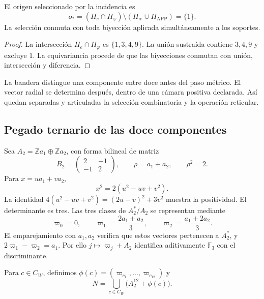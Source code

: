 \begin{lemma}
\label{lem:lf-origin}
El origen seleccionado por la incidencia es
\[
 o_*=(H_e\cap H_\varphi)
                 \setminus(H_\alpha^-\cup H_{\mathrm{APP}})
     =\{1\}.
\]
La selección conmuta con toda biyección aplicada
simultáneamente a los soportes.
\end{lemma}
\begin{proof}
La intersección \(H_e\cap H_\varphi\) es
\(\{1,3,4,9\}\). La unión sustraída contiene \(3,4,9\)
y excluye \(1\). La equivariancia procede de que las
biyecciones conmutan con unión, intersección y diferencia.
\end{proof}

La bandera distingue una componente entre doce antes del
paso métrico. El vector radial se determina después,
dentro de una cámara positiva declarada. Así quedan
separadas y articuladas la selección combinatoria y la
operación reticular.

\subsection{Pegado ternario de las doce componentes}
\label{subsec:lf-glue}

Sea \(A_2=\mathbb Za_1\oplus\mathbb Za_2\), con forma
bilineal de matriz
\[
 B_2=\begin{pmatrix}2&-1\\-1&2\end{pmatrix},
 \qquad \rho=a_1+a_2,\qquad \rho^2=2.
\]
Para \(x=ua_1+va_2\),
\[
 x^2=2(u^2-uv+v^2).
\]
La identidad
\(4(u^2-uv+v^2)=(2u-v)^2+3v^2\) muestra
la positividad. El determinante es tres. Las tres
clases de \(A_2^*/A_2\) se representan mediante
\[
 \varpi_0=0,\qquad
 \varpi_1=\frac{2a_1+a_2}{3},\qquad
 \varpi_2=\frac{a_1+2a_2}{3}.
\]
El emparejamiento con \(a_1,a_2\) verifica que estos
vectores pertenecen a \(A_2^*\), y
\(2\varpi_1-\varpi_2=a_1\). Por ello
\(j\mapsto\varpi_j+A_2\) identifica aditivamente
\(\mathbb F_3\) con el discriminante.

Para \(c\in C_W\), definimos
\(\phi(c)=(\varpi_{c_1},\ldots,\varpi_{c_{12}})\)
y
\begin{equation}
 N=\bigcup_{c\in C_W}\bigl(A_2^{12}+\phi(c)\bigr).
 \label{eq:lf-glue}
\end{equation}

